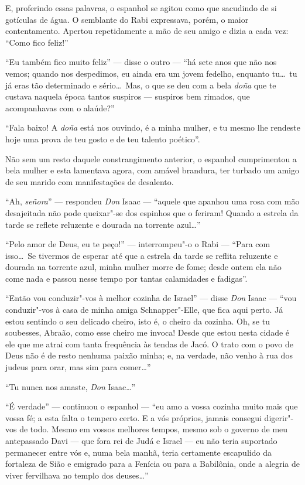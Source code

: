 E, proferindo essas palavras, o espanhol se agitou como que sacudindo de
si gotículas de água. O semblante do Rabi expressava, porém, o maior
contentamento. Apertou repetidamente a mão de seu amigo e dizia a cada
vez: ``Como fico feliz!''

``Eu também fico muito feliz'' --- disse o outro --- ``há sete anos que não nos
vemos; quando nos despedimos, eu ainda era um jovem fedelho, enquanto
tu\ldots\ tu já eras tão determinado e sério\ldots\ Mas, o que se deu com a
bela \textit{doña} que te custava naquela época tantos suspiros ---
suspiros bem rimados, que acompanhavas com o alaúde?''

``Fala baixo! A \textit{doña} está nos ouvindo, é a minha mulher, e tu
mesmo lhe rendeste hoje uma prova de teu gosto e de teu talento
poético''.

Não sem um resto daquele constrangimento anterior, o espanhol
cumprimentou a bela mulher e esta lamentava agora, com amável brandura,
ter turbado um amigo de seu marido com manifestações de desalento.

``Ah, \textit{señora}'' --- respondeu \textit{Don} Isaac --- ``aquele que
apanhou uma rosa com mão desajeitada não pode queixar"-se dos espinhos
que o feriram! Quando a estrela da tarde se reflete reluzente e dourada
na torrente azul\ldots''

``Pelo amor de Deus, eu te peço!'' --- interrompeu"-o o Rabi --- ``Para com
isso\ldots\ Se tivermos de esperar até que a estrela da tarde se reflita
reluzente e dourada na torrente azul, minha mulher morre de fome; desde
ontem ela não come nada e passou nesse tempo por tantas calamidades e
fadigas''.

``Então vou conduzir"-vos à melhor cozinha de Israel'' --- disse
\textit{Don} Isaac --- ``vou conduzir"-vos à casa de minha amiga
Schnapper"-Elle, que fica aqui perto. Já estou sentindo o seu delicado
cheiro, isto é, o cheiro da cozinha. Oh, se tu soubesses, Abraão, como
esse cheiro me invoca! Desde que estou nesta cidade é ele que me atrai
com tanta frequência às tendas de Jacó. O trato com o povo de Deus não
é de resto nenhuma paixão minha; e, na verdade, não venho à rua dos
judeus para orar, mas sim para comer\ldots''

``Tu nunca nos amaste, \textit{Don} Isaac\ldots''

``É verdade'' --- continuou o espanhol --- ``eu amo a vossa cozinha muito mais
que vossa fé; a esta falta o tempero certo. E a vós próprios, jamais
consegui digerir"-vos de todo. Mesmo em vossos melhores tempos, mesmo
sob o governo de meu antepassado Davi --- que fora rei de Judá e Israel ---
eu não teria suportado permanecer entre vós e, numa bela manhã, teria
certamente escapulido da fortaleza de Sião e emigrado para a Fenícia ou
para a Babilônia, onde a alegria de viver fervilhava no templo dos
deuses\ldots''

